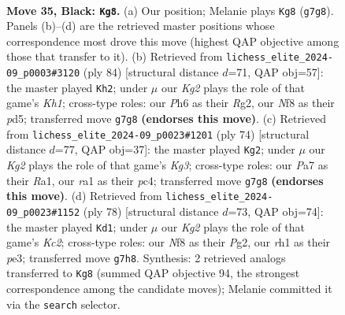 \documentclass[11pt]{article}
\begin{document}
\clearpage

\begin{figure}[p]\centering
\begin{subfigure}{0.46\textwidth}\centering
\resizebox{\linewidth}{!}{%
\newchessgame
\chessboard[
  setfen={5n2/ppQ3kp/7p/1P6/3P4/1r3q2/4N3/R5KR b - - 6 35},
  showmover=false,
  pgfstyle=straightmove, color=movearrow, markmove={g7-g8}
]}
\caption{}
\end{subfigure}\hfill
\begin{subfigure}{0.46\textwidth}\centering
\resizebox{\linewidth}{!}{%
\newchessgame
\chessboard[
  setfen={1k4r1/pp3N2/2n1Q3/3pPp2/8/7P/PP4R1/2q4K w - - 0 43},
  showmover=false,
  pgfstyle=straightmove, color=movearrow, markmove={h1-h2}
]}
\caption{}
\end{subfigure}
\\[4pt]
\begin{subfigure}{0.46\textwidth}\centering
\resizebox{\linewidth}{!}{%
\newchessgame
\chessboard[
  setfen={4r1k1/1q6/3P2p1/2p1b3/2p3P1/2N2QKP/1P6/R7 w - - 0 38},
  showmover=false,
  pgfstyle=straightmove, color=movearrow, markmove={g3-g2}
]}
\caption{}
\end{subfigure}\hfill
\begin{subfigure}{0.46\textwidth}\centering
\resizebox{\linewidth}{!}{%
\newchessgame
\chessboard[
  setfen={1r4k1/p7/6q1/6N1/2pP1Q2/2P1p3/P1K2PP1/8 w - - 0 40},
  showmover=false,
  pgfstyle=straightmove, color=movearrow, markmove={c2-d1}
]}
\caption{}
\end{subfigure}
\caption{\textbf{Move 35, Black: \texttt{Kg8}.} (a) Our position; Melanie plays \texttt{Kg8} (\texttt{g7g8}). Panels (b)--(d) are the retrieved master positions whose correspondence most drove this move (highest QAP objective among those that transfer to it). (b) Retrieved from \texttt{lichess\_elite\_2024-09\_p0003\#3120} (ply 84) [structural distance $d$=71, QAP obj=57]: the master played \texttt{Kh2}; under $\mu$ our \emph{Kg2} plays the role of that game's \emph{Kh1}; cross-type roles: our \emph{P}h6 as their \emph{R}g2, our \emph{N}f8 as their \emph{p}d5; transferred move \texttt{g7g8} \textbf{(endorses this move)}. (c) Retrieved from \texttt{lichess\_elite\_2024-09\_p0023\#1201} (ply 74) [structural distance $d$=77, QAP obj=37]: the master played \texttt{Kg2}; under $\mu$ our \emph{Kg2} plays the role of that game's \emph{Kg3}; cross-type roles: our \emph{P}a7 as their \emph{R}a1, our \emph{r}a1 as their \emph{p}c4; transferred move \texttt{g7g8} \textbf{(endorses this move)}. (d) Retrieved from \texttt{lichess\_elite\_2024-09\_p0023\#1152} (ply 78) [structural distance $d$=73, QAP obj=74]: the master played \texttt{Kd1}; under $\mu$ our \emph{Kg2} plays the role of that game's \emph{Kc2}; cross-type roles: our \emph{N}f8 as their \emph{P}g2, our \emph{r}h1 as their \emph{p}e3; transferred move \texttt{g7h8}. Synthesis: 2 retrieved analogs transferred to \texttt{Kg8} (summed QAP objective 94, the strongest correspondence among the candidate moves); Melanie committed it via the \texttt{search} selector.}
\label{fig:thought-m69}
\end{figure}
\end{document}
